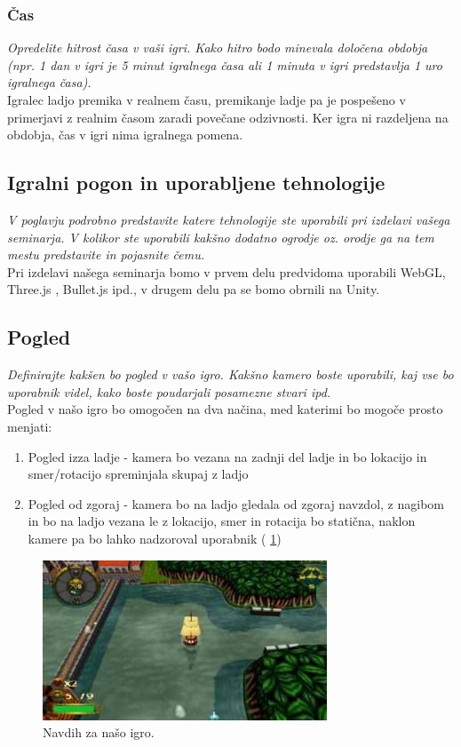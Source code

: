 \documentclass[a4paper]{article}
\begin{document}
\subsubsection{Čas}
\textit{Opredelite hitrost časa v vaši igri. Kako hitro bodo minevala določena obdobja (npr. 1 dan v igri je 5 minut igralnega časa ali 1 minuta v igri predstavlja 1 uro igralnega časa).\\
}
Igralec ladjo premika v realnem času, premikanje ladje pa je pospešeno v primerjavi z realnim časom zaradi povečane odzivnosti. Ker igra ni razdeljena na obdobja, čas v igri nima igralnega pomena.

\subsection{Igralni pogon in uporabljene tehnologije}
\textit{V poglavju podrobno predstavite katere tehnologije ste uporabili pri izdelavi vašega seminarja. V kolikor ste uporabili kakšno dodatno ogrodje oz. orodje ga na tem mestu predstavite in pojasnite čemu.\\
}
Pri izdelavi našega seminarja bomo v prvem delu predvidoma uporabili WebGL, Three.js \cite{dirksen2013learning}, Bullet.js ipd., v drugem delu pa se bomo obrnili na Unity.

\subsection{Pogled}
\textit{Definirajte kakšen bo pogled v vašo igro. Kakšno kamero boste uporabili, kaj vse bo uporabnik videl, kako boste poudarjali posamezne stvari ipd.\\
}
Pogled v našo igro bo omogočen na dva načina, med katerimi bo mogoče prosto menjati:
\begin{enumerate}
\item Pogled izza ladje - kamera bo vezana na zadnji del ladje in bo lokacijo in smer/rotacijo spreminjala skupaj z ladjo
\item Pogled od zgoraj - kamera bo na ladjo gledala od zgoraj navzdol, z nagibom in bo na ladjo vezana le z lokacijo, smer in rotacija bo statična, naklon kamere pa bo lahko nadzoroval uporabnik ( \ref{fig:slika})
\end{enumerate}

\begin{figure}[!htb]
    \begin{center}
        \includegraphics[width=\columnwidth]{Overboard.jpg}
        \caption{Navdih za našo igro.} \label{fig:slika}
    \end{center}
\end{figure}


\small


\end{document}
